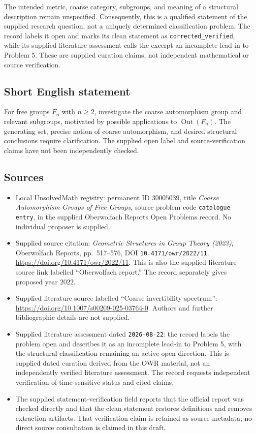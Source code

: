\documentclass[11pt]{article}
\begin{document}
The intended metric, coarse category, subgroups, and meaning of a structural description remain unspecified. Consequently, this is a qualified statement of the supplied research question, not a uniquely determined classification problem. The record labels it open and marks its clean statement as \texttt{corrected\_verified}, while its supplied literature assessment calls the excerpt an incomplete lead-in to Problem 5. These are supplied curation claims, not independent mathematical or source verification.
\subsection{Short English statement}
For free groups \(F_n\) with \(n\geq 2\), investigate the coarse automorphism group and relevant subgroups, motivated by possible applications to \(\operatorname{Out}(F_n)\). The generating set, precise notion of coarse automorphism, and desired structural conclusions require clarification. The supplied open label and source-verification claims have not been independently checked.
\subsection{Sources}
\begin{itemize}
\item Local UnsolvedMath registry: permanent ID \(30005039\), title \emph{Coarse Automorphism Groups of Free Groups}, source problem code \texttt{catalogue entry}, in the supplied Oberwolfach Reports Open Problems record. No individual proposer is supplied.
\item Supplied source citation: \emph{Geometric Structures in Group Theory (2023)}, Oberwolfach Reports, pp.\ 517--576, DOI \texttt{10.4171/owr/2022/11}. \url{https://doi.org/10.4171/owr/2022/11}. This is also the supplied literature-source link labelled ``Oberwolfach report.'' The record separately gives proposed year \(2022\).
\item Supplied literature source labelled ``Coarse invertibility spectrum'': \url{https://doi.org/10.1007/s00209-025-03764-0}. Authors and further bibliographic details are not supplied.
\item Supplied literature assessment dated \texttt{2026-08-22}: the record labels the problem open and describes it as an incomplete lead-in to Problem 5, with the structural classification remaining an active open direction. This is supplied dated curation derived from the OWR material, not an independently verified literature assessment. The record requests independent verification of time-sensitive status and cited claims.
\item The supplied statement-verification field reports that the official report was checked directly and that the clean statement restores definitions and removes extraction artifacts. That verification claim is retained as source metadata; no direct source consultation is claimed in this draft.
\end{itemize}
\end{document}
